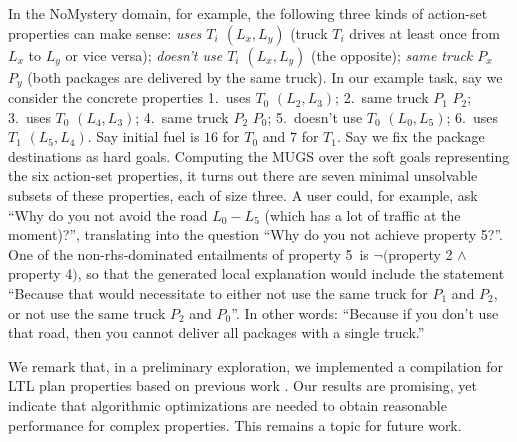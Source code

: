 In the NoMystery domain, for example, the following three kinds of
action-set properties can make sense: \emph{uses $T_i$ $(L_x,L_y)$}
(truck $T_i$ drives at least once from $L_x$ to $L_y$ or vice versa);
\emph{doesn't use $T_i$ $(L_x,L_y)$} (the opposite); \emph{same truck
  $P_x$ $P_y$} (both packages are delivered by the same truck). In our
example task, say we consider the concrete properties 1.\ uses $T_0$
$(L_2,L_3)$; 2.\ same truck $P_1$ $P_2$; 3.\ uses $T_0$ $(L_4,L_3)$;
4.\ same truck $P_2$ $P_0$; 5.\ doesn't use $T_0$ $(L_0,L_5)$;
6.\ uses $T_1$ $(L_5,L_4)$. Say initial fuel is $16$ for $T_0$ and $7$
for $T_1$. Say we fix the package destinations as hard
goals. Computing the MUGS over the soft goals representing the six
action-set properties, it turns out there are seven minimal unsolvable
subsets of these properties, each of size three. A user could, for
example, ask ``Why do you not avoid the road $L_0-L_5$ (which has a
lot of traffic at the moment)?'', translating into the question ``Why
do you not achieve property 5?''. One of the non-rhs-dominated
entailments of property 5\ is $\neg($property 2 $\wedge$ property
4$)$, so that the generated local explanation would include the
statement ``Because that would necessitate to either not use the same
truck for $P_1$ and $P_2$, or not use the same truck $P_2$ and
$P_0$''. In other words: ``Because if you don't use that road, then
you cannot deliver all packages with a single truck.''

%
%

We remark that, in a preliminary exploration, we implemented a
compilation for LTL plan properties based on previous work
\cite{edelkamp:icaps-06,baier:etal:ai-09}. Our results are promising,
yet indicate that algorithmic optimizations are needed to obtain
reasonable performance for complex properties. This remains a topic
for future work.






